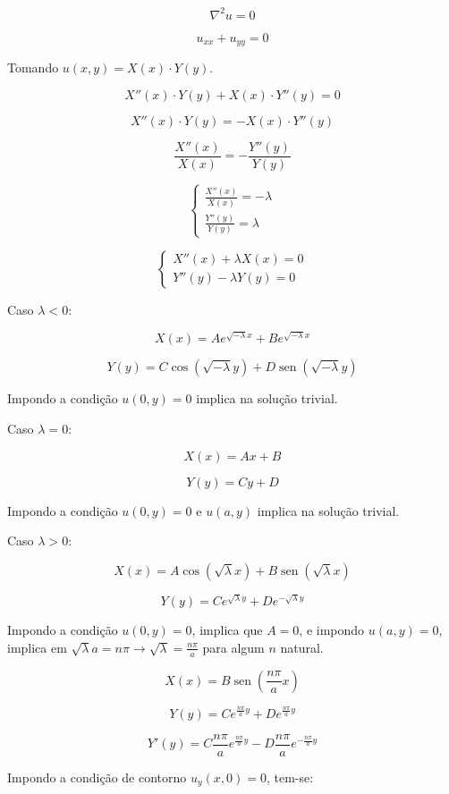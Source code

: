 \documentclass[12pt, a4paper, portuguese]{fphw}
\DeclareMathOperator{\sen}{sen}
\begin{document}
$$
\nabla^2 u = 0
$$

$$
u_{xx} + u_{yy} = 0
$$

Tomando $ u(x, y) = X(x) \cdot Y(y) $.

$$
X''(x) \cdot Y(y) + X(x) \cdot Y''(y) = 0
$$

$$
X''(x) \cdot Y(y) = -X(x) \cdot Y''(y)
$$

$$
\frac{X''(x)}{X(x)} = - \frac{Y''(y)}{Y(y)}
$$

$$
\begin{cases}
\frac{X''(x)}{X(x)} = - \lambda \\
\frac{Y''(y)}{Y(y)} = \lambda
\end{cases}
$$

$$
\begin{cases}
X''(x) + \lambda X(x) = 0 \\
Y''(y) - \lambda Y(y) = 0
\end{cases}
$$

Caso $ \lambda < 0 $:

$$
X(x) = A e^{\sqrt{-\lambda} x} + B e^{\sqrt{-\lambda} x}
$$

$$
Y(y) = C \cos \left( \sqrt{-\lambda} y \right) + D \sen \left( \sqrt{-\lambda} y \right)
$$

Impondo a condição $ u(0, y) = 0 $ implica na solução trivial.

Caso $ \lambda = 0 $:

$$
X(x) = Ax + B
$$

$$
Y(y) = Cy + D
$$

Impondo a condição $ u(0, y) = 0 $ e $ u(a, y) $ implica na solução trivial.

Caso $ \lambda > 0 $:

$$
X(x) = A \cos \left( \sqrt{\lambda} x \right) + B \sen \left( \sqrt{\lambda} x \right)
$$

$$
Y(y) = C e^{\sqrt{\lambda} y} + D e^{-\sqrt{\lambda} y}
$$

Impondo a condição $ u(0, y) = 0 $, implica que $ A = 0 $, e impondo $ u(a, y) = 0 $, implica em $ \sqrt{\lambda} a = n \pi \rightarrow \sqrt{\lambda} = \frac{n \pi}{a} $ para algum $ n $ natural.

$$
X(x) = B \sen \left( \frac{n \pi}{a} x \right)
$$

$$
Y(y) = C e^{\frac{n \pi}{a} y} + D e^{\frac{n \pi}{a} y}
$$

$$
Y'(y) = C \frac{n \pi}{a} e^{\frac{n \pi}{a} y} - D \frac{n \pi}{a} e^{-\frac{n \pi}{a} y}
$$

Impondo a condição de contorno $ u_y(x, 0) = 0 $, tem-se:
\end{document}
